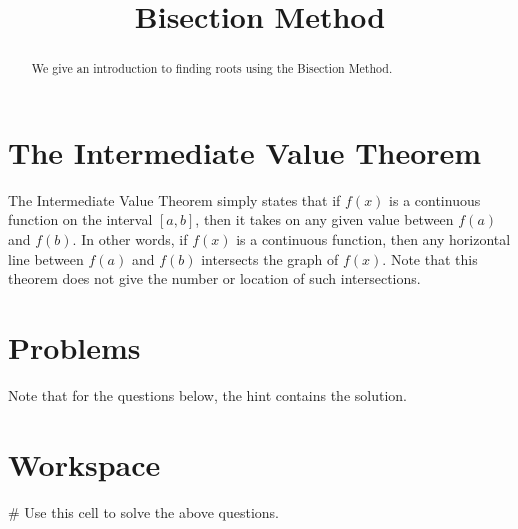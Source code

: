 \documentclass{ximera}
\title{Bisection Method}
\begin{document}
  
\begin{abstract}  
We give an introduction to finding roots using the Bisection Method.
\end{abstract}  
\maketitle

\section{The Intermediate Value Theorem}

The Intermediate Value Theorem simply states that if $f(x)$ is a continuous function on the interval $[a,b]$, then it takes on any given value between $f(a)$ and $f(b)$. In other words, if $f(x)$ is a continuous function, then any horizontal line between $f(a)$ and $f(b)$ intersects the graph of $f(x)$. Note that this theorem does not give the number or location of such intersections.


\section{Problems}

Note that for the questions below, the hint contains the solution.

\begin{question}
\end{question}

\section{Workspace}

\begin{sageCell}
# Use this cell to solve the above questions.
\end{sageCell}
\end{document}
